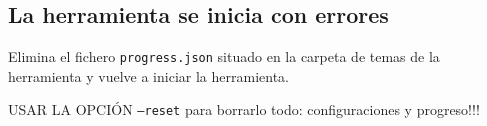 \documentclass[]{article}
\begin{document}


\subsection{La herramienta se inicia con errores}
Elimina el fichero \texttt{progress.json} situado en la carpeta de temas de la herramienta y vuelve a iniciar la herramienta.

USAR LA OPCIÓN 	\texttt{--reset} para borrarlo todo: configuraciones y progreso!!!
\end{document}

